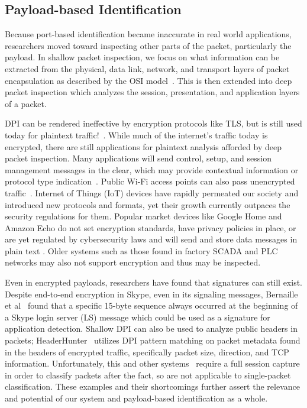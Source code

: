 \subsection{Payload-based Identification}
Because port-based identification became inaccurate in real world applications, researchers moved toward inspecting other parts of the packet, particularly the payload. In shallow packet inspection, we focus on what information can be extracted from the physical, data link, network, and transport layers of packet encapsulation as described by the OSI model~\cite{OSI}. This is then extended into deep packet inspection which analyzes the session, presentation, and application layers of a packet.

DPI can be rendered ineffective by encryption protocols like TLS, but is still used today for plaintext traffic!~\cite{ZHAO202122}. While much of the internet's traffic today is encrypted, there are still applications for plaintext analysis afforded by deep packet inspection. Many applications will send control, setup, and session management messages in the clear, which may provide contextual information or protocol type indication~\cite{Hasanzadeh, Ogudo, Zhang}. Public Wi-Fi access points can also pass unencrypted traffic~\cite{Maimon}. Internet of Things (IoT) devices have rapidly permeated our society and introduced new protocols and formats, yet their growth currently outpaces the security regulations for them. Popular market devices like Google Home and Amazon Echo do not set encryption standards, have privacy policies in place, or are yet regulated by cybersecurity laws and will send and store data messages in plain text \cite{wood2017cleartext, Capellupo, WangYong}. Older systems such as those found in factory SCADA and PLC networks may also not support encryption \cite{Malaka} and thus may be inspected.

Even in encrypted payloads, researchers have found that signatures can still exist. Despite end-to-end encryption in Skype, even in its signaling messages, Bernaille et al~\cite{Bernaille} found that a specific 15-byte sequence always occurred at the beginning of a Skype login server (LS) message which could be used as a signature for application detection. Shallow DPI can also be used to analyze public headers in packets; HeaderHunter~\cite{HeaderHunter} utilizes DPI pattern matching on packet metadata found in the headers of encrypted traffic, specifically packet size, direction, and TCP information. Unfortunately, this and other systems~\cite{Moore2013DiscriminatorsFU, Roughan} require a full session capture in order to classify packets after the fact, so are not applicable to single-packet classification. These examples and their shortcomings further assert the relevance and potential of our system and payload-based identification as a whole.


